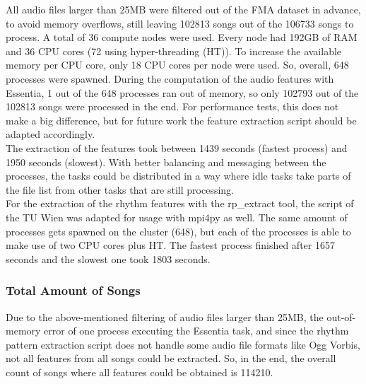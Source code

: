 \noindent All audio files larger than 25MB were filtered out of the FMA dataset in advance, to avoid memory overflows, still leaving 102813 songs out of the 106733 songs to process. A total of 36 compute nodes were used. Every node had 192GB of RAM and 36 CPU cores (72 using hyper-threading (HT)). To increase the available memory per CPU core, only 18 CPU cores per node were used. So, overall, 648 processes were spawned. During the computation of the audio features with Essentia, 1 out of the 648 processes ran out of memory, so only 102793 out of the 102813 songs were processed in the end. For performance tests, this does not make a big difference, but for future work the feature extraction script should be adapted accordingly.\\
The extraction of the features took between 1439 seconds (fastest process) and 1950 seconds (slowest). With better balancing and messaging between the processes, the tasks could be distributed in a way where idle tasks take parts of the file list from other tasks that are still processing.\\
\noindent For the extraction of the rhythm features with the rp\_extract tool, the script of the TU Wien was adapted for usage with mpi4py as well. The same amount of processes gets spawned on the cluster (648), but each of the processes is able to make use of two CPU cores plus HT. The fastest process finished after 1657 seconds and the slowest one took 1803 seconds.

\subsubsection{Total Amount of Songs}\label{totamsong}

Due to the above-mentioned filtering of audio files larger than 25MB, the out-of-memory error of one process executing the Essentia task, and since the rhythm pattern extraction script does not handle some audio file formats like Ogg Vorbis, not all features from all songs could be extracted. So, in the end, the overall count of songs where all features could be obtained is 114210.\\


